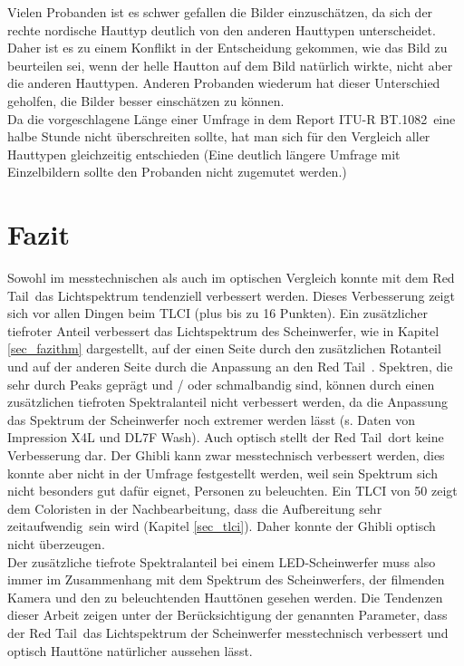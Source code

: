 Vielen Probanden ist es schwer gefallen die Bilder einzuschätzen, da sich der rechte nordische Hauttyp deutlich von den anderen Hauttypen unterscheidet. Daher ist es zu einem Konflikt in der Entscheidung gekommen, wie das Bild zu beurteilen sei, wenn der helle Hautton auf dem Bild natürlich wirkte, nicht aber die anderen Hauttypen. Anderen Probanden wiederum hat dieser Unterschied geholfen, die Bilder besser einschätzen zu können.\\
Da die vorgeschlagene Länge einer Umfrage in dem \glqq Report ITU-R BT.1082\grqq\ eine halbe Stunde nicht überschreiten sollte, hat man sich für den Vergleich aller Hauttypen gleichzeitig entschieden (Eine deutlich längere Umfrage mit Einzelbildern sollte den Probanden nicht zugemutet werden.)



\chapter{Fazit}
Sowohl im messtechnischen als auch im optischen Vergleich konnte mit dem \glqq Red Tail\grqq\ das Lichtspektrum tendenziell verbessert werden. Dieses Verbesserung zeigt sich vor allen Dingen beim TLCI (plus bis zu 16 Punkten). Ein zusätzlicher tiefroter Anteil verbessert das Lichtspektrum des Scheinwerfer, wie in Kapitel \ref{sec_fazithm} dargestellt, auf der einen Seite durch den zusätzlichen Rotanteil und auf der anderen Seite durch die Anpassung an den \glqq Red Tail\grqq\ . Spektren, die sehr durch Peaks geprägt und / oder schmalbandig sind, können durch einen zusätzlichen tiefroten Spektralanteil nicht verbessert werden, da die Anpassung das Spektrum der Scheinwerfer noch extremer werden lässt (s. Daten von Impression X4L und DL7F Wash). Auch optisch stellt der \glqq Red Tail\grqq\ dort keine Verbesserung dar. Der Ghibli kann zwar messtechnisch verbessert werden, dies konnte aber nicht in der Umfrage festgestellt werden, weil sein Spektrum sich nicht besonders gut dafür eignet, Personen zu beleuchten. Ein TLCI von 50 zeigt dem Coloristen in der Nachbearbeitung, dass die \glqq Aufbereitung sehr zeitaufwendig\grqq\ sein wird (Kapitel \ref{sec_tlci}). Daher konnte der Ghibli optisch nicht überzeugen.\\
Der zusätzliche tiefrote Spektralanteil bei einem LED-Scheinwerfer muss also immer im Zusammenhang mit dem Spektrum des Scheinwerfers, der filmenden Kamera und den zu beleuchtenden Hauttönen gesehen werden. Die Tendenzen dieser Arbeit zeigen unter der Berücksichtigung der genannten Parameter, dass der \glqq Red Tail\grqq\ das Lichtspektrum der Scheinwerfer messtechnisch verbessert und optisch Hauttöne natürlicher aussehen lässt.

